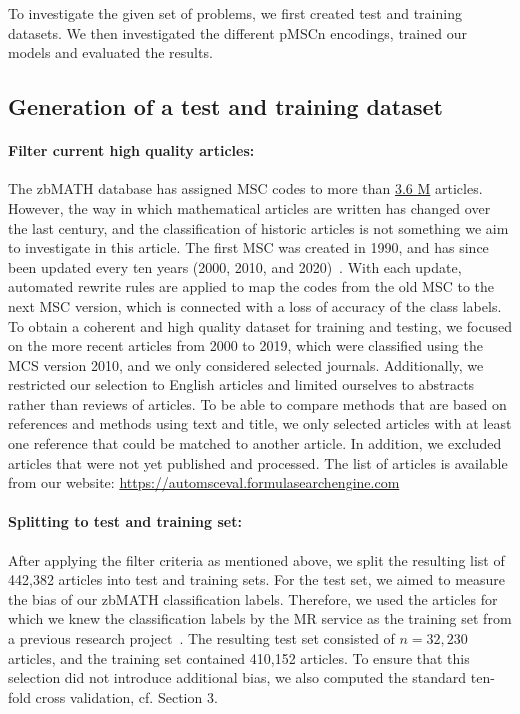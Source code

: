 To investigate the given set of problems, we first created test and training datasets.
We then investigated the different pMSCn encodings, trained our models and evaluated the results.

\subsection{Generation of a test and training dataset}
\paragraph{Filter current high quality articles:}
The zbMATH database has assigned MSC codes to more than \href{https://zbmath.org/?q=cc\%3A*}{3.6 M} articles.
However, the way in which mathematical articles are written has changed over the last century, and the classification of historic articles is not something we aim to investigate in this article.
The first MSC was created in 1990, and has since been updated every ten years (2000, 2010, and 2020)~\cite{MSC2010}.
With each update, automated rewrite rules are applied to map the codes from the old MSC to the next MSC version, which is connected with a loss of accuracy of the class labels.
To obtain a coherent and high quality dataset for training and testing, we focused on the more recent articles from 2000 to 2019, which were classified using the MCS version 2010, and we only considered selected journals.
Additionally, we restricted our selection to English articles and limited ourselves to abstracts rather than reviews of articles.
To be able to compare methods that are based on references and methods using text and title, we only selected articles with at least one reference that could be matched to another article.
In addition, we excluded articles that were not yet published and processed.
The list of articles is available from our website: \url{https://automsceval.formulasearchengine.com}
\paragraph{Splitting to test and training set:}
After applying the filter criteria as mentioned above, we split the resulting list of 442,382 articles into test and training sets.
For the test set, we aimed to measure the bias of our zbMATH classification labels.
Therefore, we used the articles for which we knew the classification labels by the MR service as the training set from a previous research project~\cite{Bannister2018}.
The resulting test set consisted of \(n = 32,230\) articles, and the training set contained 410,152 articles.
To ensure that this selection did not introduce additional bias, we also computed the standard ten-fold cross validation, cf. Section 3.
